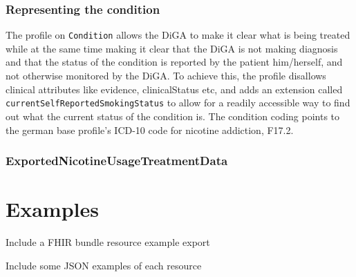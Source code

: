 \documentclass[12px]{report}
\def\code#1{\texttt{#1}} %
\begin{document}



\subsection{Representing the condition}

The profile on \code{Condition} allows the DiGA to make it clear what is being treated while at the same time making it clear that the DiGA is not making diagnosis and that the status of the condition is reported by the patient him/herself, 
and not otherwise monitored by the DiGA. To achieve this, the profile disallows clinical attributes like evidence, clinicalStatus etc, and adds an extension called \code{currentSelfReportedSmokingStatus} to allow for a readily accessible way to find out what the current status of the condition is. 
The condition coding points to the german base profile's ICD-10 code for nicotine addiction, F17.2.

\subsection{ExportedNicotineUsageTreatmentData}
\label{sec:comp}

\printbibliography[heading=bibintoc, title={References}]


\appendix

\chapter{Examples}
\label{app:ex}

Include a FHIR bundle resource example export

Include some JSON examples of each resource
\end{document}
